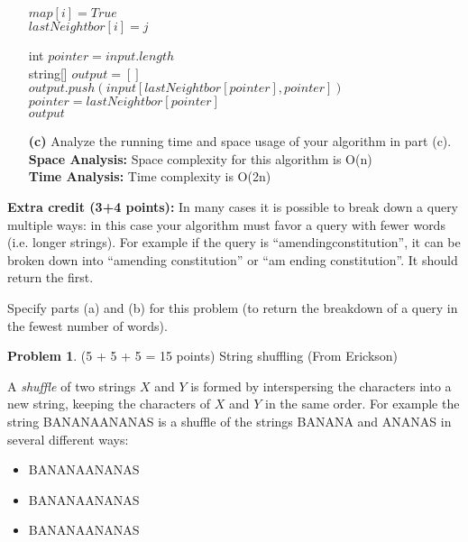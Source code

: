 \documentclass[11pt]{article}
\theoremstyle{definition}
\theoremstyle{theorem}
\newtheorem{prob}{Problem}
\begin{document}
\begin{itemize}
\begin{algorithm}[H]
{   {
     {
       {
        $map[i] = True$ \\
        $lastNeightbor[i] = j$ \\
      }
    }
  }
  
   {
    int $pointer = input.length$ \\
    string[] $output = []$ \\
     {
      $output.push(input[lastNeightbor[pointer], pointer])$ \\
      $pointer = lastNeightbor[pointer] $ \\
    }
    \Return $output$
  }
  \Return {[]}
}
\end{algorithm}

\item[{\bf (c)}]
  Analyze the running time and space usage of your algorithm in part (c).\\
\textbf{Space Analysis:} Space complexity for this algorithm is O(n) \\
\textbf{Time Analysis:} Time complexity is O(2n) \\

\end{itemize}

{\bf Extra credit (3+4 points):} In many cases it is possible to break down a query multiple ways: in this case your algorithm must favor a query with fewer words (i.e. longer strings). For example if the query is ``amendingconstitution'', it can be broken down into ``amending constitution'' or ``am ending constitution''. It should return the first.

Specify parts (a) and (b) for this problem (to return the breakdown of a query in the fewest number of words). 

\begin{prob}
(5 + 5 + 5 = 15 points) String shuffling (From Erickson)
\end{prob}

A {\em shuffle} of two strings $X$ and $Y$ is formed by interspersing the characters into a new string, keeping the characters of $X$ and $Y$ in the same order. For example the string {\color{red} BANANAANANAS} is a shuffle of the strings {\color{blue}BANANA} and {\color{red}ANANAS} in several different ways: 
\begin{itemize}
    \item{{\color{blue}BANANA}{\color{red}ANANAS}}
    \item{{\color{blue}BAN}{\color{red}ANA}{\color{blue}ANA}{\color{red}NAS}}
    \item{{\color{blue}B}{\color{red}AN}{\color{blue}AN}{\color{red}A}{\color{blue}A}{\color{red}NA}{\color{blue}NA}{\color{red}S}}
\end{itemize}
\end{document}
